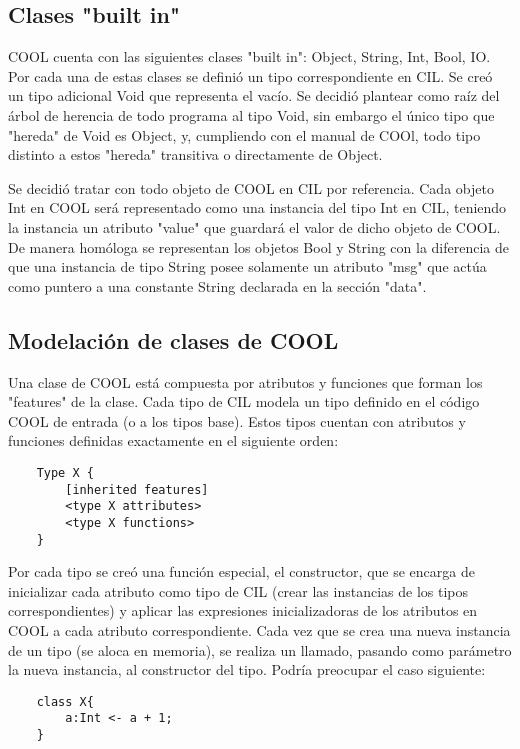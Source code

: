 \documentclass[]{article}
\begin{document}
\subsection{Clases "built in"}
COOL cuenta con las siguientes clases "built in": Object, String, Int, Bool, IO.
Por cada una de estas clases se defini\'o un tipo correspondiente en CIL. Se cre\'o un tipo adicional Void que representa el vac\'io. Se decidi\'o plantear como ra\'iz del \'arbol de herencia de todo programa al tipo Void, sin embargo el \'unico tipo que "hereda" de Void es Object, y, cumpliendo con el manual de COOl, todo tipo distinto a estos "hereda" transitiva o directamente de Object. 

Se decidi\'o tratar con todo objeto de COOL en CIL por referencia. Cada objeto Int en COOL ser\'a representado como una instancia del tipo Int en CIL, teniendo la instancia un atributo "value" que guardar\'a el valor de dicho objeto de COOL. De manera hom\'ologa se representan los objetos Bool y String con la diferencia de que una instancia de tipo String posee solamente un atributo "msg" que act\'ua como puntero a una constante String declarada en la secci\'on "data".

\subsection{Modelaci\'on de clases de COOL}
Una clase de COOL est\'a compuesta por atributos y funciones que forman los "features" de la clase. Cada tipo de CIL modela un tipo definido en el c\'odigo COOL de entrada (o a los tipos base). Estos tipos cuentan con atributos y funciones definidas exactamente en el siguiente orden:\\

\begin{lstlisting}
	Type X {
		[inherited features]
		<type X attributes>
		<type X functions>
	}
\end{lstlisting}



Por cada tipo se cre\'o una funci\'on especial, el constructor, que se encarga de inicializar cada atributo como tipo de CIL (crear las instancias de los tipos correspondientes) y aplicar las expresiones inicializadoras de los atributos en COOL a cada atributo correspondiente. Cada vez que se crea una nueva instancia de un tipo (se aloca en memoria), se realiza un llamado, pasando como par\'ametro la nueva instancia, al constructor del tipo. Podr\'ia preocupar el caso siguiente:\\
\begin{lstlisting}
	class X{
		a:Int <- a + 1;
	}
\end{lstlisting}
\end{document}
